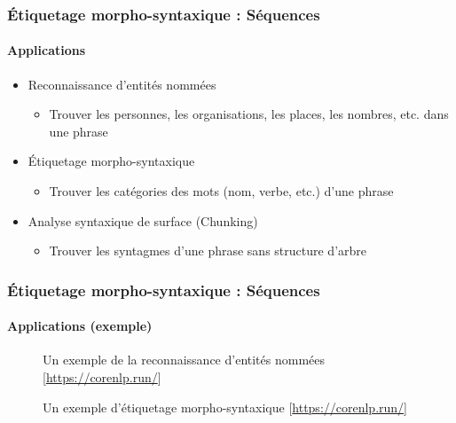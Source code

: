\documentclass[xcolor=table]{beamer}
\begin{document}
\begin{frame}
\frametitle{Étiquetage morpho-syntaxique : Séquences}
\framesubtitle{Applications}

\begin{itemize}
	\item Reconnaissance d'entités nommées
	\begin{itemize}
		\item Trouver les personnes, les organisations, les places, les nombres, etc. dans une phrase
	\end{itemize}
	\item Étiquetage morpho-syntaxique
	\begin{itemize}
		\item Trouver les catégories des mots (nom, verbe, etc.) d'une phrase
	\end{itemize}
	\item Analyse syntaxique de surface (Chunking)
	\begin{itemize}
		\item Trouver les syntagmes d'une phrase sans structure d'arbre
	\end{itemize}
\end{itemize}


\end{frame}

\begin{frame}
\frametitle{Étiquetage morpho-syntaxique : Séquences}
\framesubtitle{Applications (exemple)}

\begin{figure}
	\centering
	\caption{Un exemple de la reconnaissance d'entités nommées [\url{https://corenlp.run/}]}
\end{figure}

\begin{figure}
	\centering
	\caption{Un exemple d'étiquetage morpho-syntaxique [\url{https://corenlp.run/}]}
\end{figure}

\end{frame}

%
%
%
\end{document}
